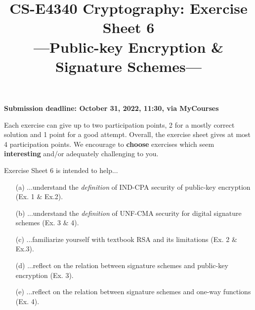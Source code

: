 \documentclass[envcountsame,runningheads,notitlepage]{../llncs}
\title{CS-E4340 Cryptography: Exercise Sheet 6\\%
\large ---Public-key Encryption %
\& Signature Schemes---}
\author{}\institute{}%
\date{}
\theoremstyle{definition}
\begin{document}
\maketitle

\medskip
\textbf{Submission deadline: October 31, 2022, 11:30, via MyCourses}

\medskip
\noindent
Each exercise can give up to two participation points, 2 for a mostly correct solution and 1 point for a good attempt. Overall, the exercise sheet gives at most 4 participation points. We encourage to \textbf{choose} exercises which seem \textbf{interesting} and/or adequately challenging to you. %


\medskip
\noindent
Exercise Sheet 6 is intended to help...
\begin{itemize}
\item[(a)] ...understand the \emph{definition} of IND-CPA security of public-key encryption (Ex. 1 $\&$ Ex.2).
\item[(b)] ...understand the \emph{definition} of UNF-CMA security for digital signature schemes (Ex. 3 $\&$ 4).
\item[(c)] ...familiarize yourself with textbook RSA and its limitations (Ex. 2 $\&$ Ex.3).
\item[(d)] ...reflect on the relation between signature schemes and public-key encryption (Ex. 3).
\item[(e)] ...reflect on the relation between signature schemes and one-way functions (Ex. 4).
\end{itemize}

\end{document}
